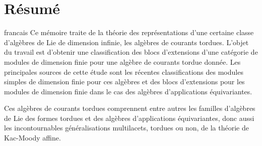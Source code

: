 \chapter*{Résumé}                      %

\begin{otherlanguage*}{francais}
Ce mémoire traite de la théorie des représentations d'une certaine classe d'algèbres de Lie de dimension infinie, les algèbres de courants tordues. L'objet du travail est d'obtenir une classification des blocs d'extensions d'une catégorie de modules de dimension finie pour une algèbre de courants tordue donnée. Les principales sources de cette étude sont les récentes classifications des modules simples de dimension finie pour ces algèbres et des blocs d'extensions pour les modules de dimension finie dans le cas des algèbres d'applications équivariantes. 

Ces algèbres de courants tordues comprennent entre autres les familles d'algèbres de Lie des formes tordues et des algèbres d'applications équivariantes, donc aussi les incontournables généralisations multilacets, tordues ou non, de la théorie de Kac-Moody affine.
\end{otherlanguage*}
